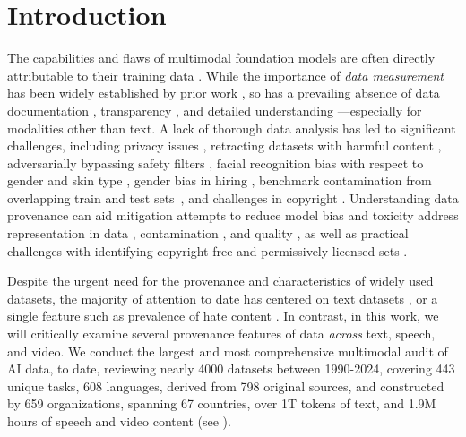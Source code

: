 \section{Introduction}
\label{sec:introduction}


The capabilities and flaws of multimodal foundation models are often directly attributable to their training data \citep{carlini2023quantifying,rando2022redteamingstablediffusionsafety,carlini2023, parmar2024datadataeverywhereguide, liu2023llava, liu2023improvedllava, nvlm2024}. 
While the importance of \emph{data measurement} has been widely established by prior work  \citep{gadre2024datacomp}, so has a prevailing absence of data documentation \citep{gebru2021datasheets, bender-friedman-2018-data}, transparency \citep{bommasani2023foundation}, and detailed understanding \citep{dodge2021documenting, bandy2021addressing, sambasivan2021everyone}---especially for modalities other than text.
A lack of thorough data analysis has led to significant challenges, including privacy issues \citep{Subramani2023-gj}, retracting datasets with harmful content \citep{birhane2021multimodal,David2023AIDatasetCSAM}, adversarially bypassing safety filters \citep{rando2022redteamingstablediffusionsafety}, facial recognition bias with respect to gender and skin type \citep{Buolamwini2018}, gender bias in hiring \citep{AWSGenderBias}, benchmark contamination from overlapping train and test sets~\citep{platypus2023}, and challenges in copyright \citep{henderson2023foundation}. 
Understanding data provenance can aid mitigation attempts to reduce model bias and toxicity \citep{welbl2021challenges,pozzobon2023} address representation in data \citep{xu2021detoxifying}, contamination \citep{elazars}, and quality \citep{kreutzer2022quality,marion2023moreinvestigatingdatapruning}, as well as practical challenges with identifying copyright-free and permissively licensed sets \citep{min2023SILOLM}.

Despite the urgent need for the provenance and characteristics of widely used datasets, the majority of attention to date has centered on text datasets \citep{elazars, longpre2023data}, or a single feature such as prevalence of hate content  \citep{dodge2021documenting,birhane2021multimodal}. In contrast, in this work, we will critically examine several provenance features of data \emph{across} text, speech, and video. We conduct the largest and most comprehensive multimodal audit of AI data, to date, reviewing nearly 4000 datasets between 1990-2024, covering 443 unique tasks, 608 languages, derived from 798 original sources, and constructed by 659 organizations, spanning 67 countries, over 1T tokens of text, and 1.9M hours of speech and video content (see ).

